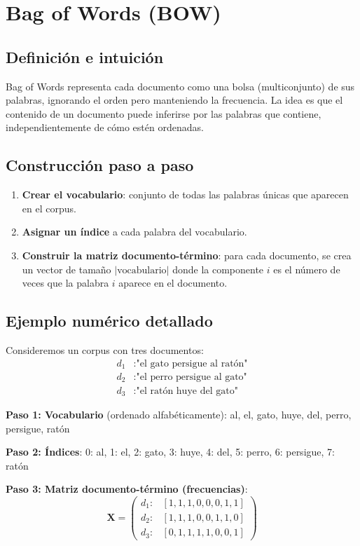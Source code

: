 \documentclass[12pt,a4paper,openany,oneside]{book}
\begin{document}
\section{Bag of Words (BOW)}

\subsection{Definición e intuición}
Bag of Words representa cada documento como una bolsa (multiconjunto) de sus palabras, ignorando el orden pero manteniendo la frecuencia. La idea es que el contenido de un documento puede inferirse por las palabras que contiene, independientemente de cómo estén ordenadas.

\subsection{Construcción paso a paso}
\begin{enumerate}
    \item \textbf{Crear el vocabulario}: conjunto de todas las palabras únicas que aparecen en el corpus.
    \item \textbf{Asignar un índice} a cada palabra del vocabulario.
    \item \textbf{Construir la matriz documento-término}: para cada documento, se crea un vector de tamaño \(|\text{vocabulario}|\) donde la componente \(i\) es el número de veces que la palabra \(i\) aparece en el documento.
\end{enumerate}

\subsection{Ejemplo numérico detallado}
Consideremos un corpus con tres documentos:
\begin{align*}
d_1 &: \text{"el gato persigue al ratón"} \\
d_2 &: \text{"el perro persigue al gato"} \\
d_3 &: \text{"el ratón huye del gato"}
\end{align*}

\textbf{Paso 1: Vocabulario} (ordenado alfabéticamente):
al, el, gato, huye, del, perro, persigue, ratón

\textbf{Paso 2: Índices}:
0: al, 1: el, 2: gato, 3: huye, 4: del, 5: perro, 6: persigue, 7: ratón

\textbf{Paso 3: Matriz documento-término (frecuencias)}:
\[
\mathbf{X} = \begin{pmatrix}
d_1: & [1, 1, 1, 0, 0, 0, 1, 1] \\
d_2: & [1, 1, 1, 0, 0, 1, 1, 0] \\
d_3: & [0, 1, 1, 1, 1, 0, 0, 1]
\end{pmatrix}
\]
\end{document}
